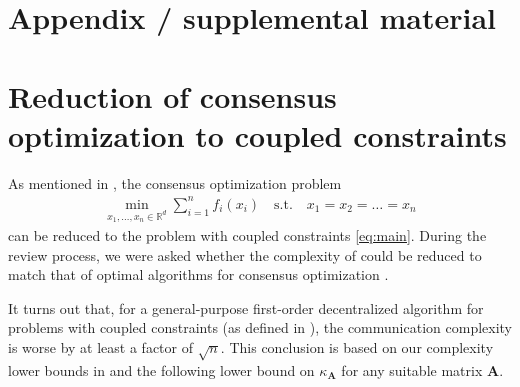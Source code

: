 \documentclass{article}
\newcommand{\qst}{\quad \text{s.t.} \quad}
\newcommand{\R}{\mathbb{R}}
\newcommand{\sX}{\R^d}
\newcommand{\mA}{\mathbf{A}}
\begin{document}
\cite*{}




\newpage
\appendix
\section*{Appendix / supplemental material}

\section{Reduction of consensus optimization to coupled constraints}\label{sec:consensus_vs_coupled}

As mentioned in , the consensus optimization problem 
\begin{align*}
  \min_{x_1,\ldots,x_n \in \sX} \sum_{i=1}^n f_i(x_i) \qst x_1 = x_2 = \ldots = x_n
\end{align*}
can be reduced to the problem with coupled constraints \eqref{eq:main}.
During the review process, we were asked whether the complexity of  could be reduced to match that of optimal algorithms for consensus optimization \cite{scaman2017optimal}.

It turns out that, for a general-purpose first-order decentralized algorithm for problems with coupled constraints (as defined in ), the communication complexity is worse by at least  a factor of $\sqrt{n}$. This conclusion is based on our complexity lower bounds in  and the following lower bound on $\kappa_\mA$ for any suitable matrix $\mA$.
\end{document}
